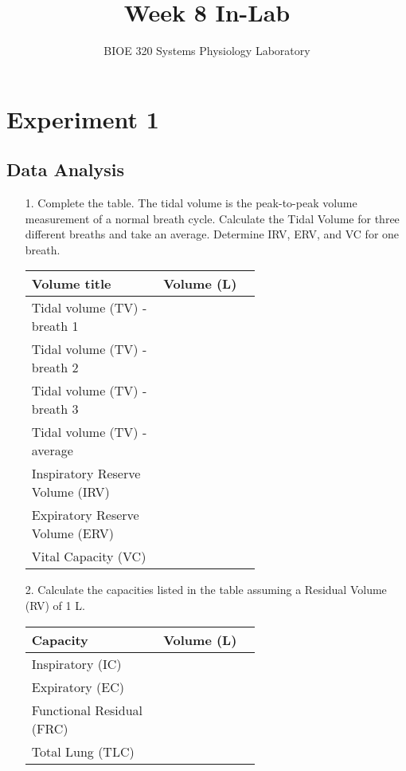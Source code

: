 \documentclass{article}
\title{Week 8 In-Lab}
\author{BIOE 320 Systems Physiology Laboratory}
\date{}
\begin{document}
\large
\maketitle

\section*{Experiment 1}
\subsection*{Data Analysis}
\begin{itemize}
	\item[1.] Complete the table. The tidal volume is the peak-to-peak volume measurement of a normal breath cycle. Calculate the Tidal Volume for three different breaths and take an average. Determine IRV, ERV, and VC for one breath.
	
	\begin{table}[h]
	\centering
	\begin{tabular}[h!]{p{0.35\linewidth}|p{0.25\linewidth}}
	\toprule
	Volume title & Volume (L)\\
	\midrule
	Tidal volume (TV) - breath 1 & \\\midrule
	Tidal volume (TV) - breath 2 & \\\midrule
	Tidal volume (TV) - breath 3 & \\\midrule
	Tidal volume (TV) - average & \\\midrule
	Inspiratory Reserve Volume (IRV) & \\\midrule
	Expiratory Reserve Volume (ERV) & \\\midrule
	Vital Capacity (VC) & \\
	\bottomrule
	\end{tabular}
	\end{table}\vspace{0cm}
	
	\item[2.] Calculate the capacities listed in the table assuming a Residual Volume (RV) of 1 L.
	
	\begin{table}[h]
	\centering
	\begin{tabular}[h!]{p{0.35\linewidth}|p{0.25\linewidth}}
	\toprule
	Capacity & Volume (L)\\
	\midrule
	Inspiratory (IC) & \\\midrule
	Expiratory (EC) & \\\midrule
	Functional Residual (FRC) & \\\midrule
	Total Lung (TLC) & \\
	\bottomrule
	\end{tabular}
	\end{table}\vspace{0cm}
	

\end{itemize}
\end{document}
